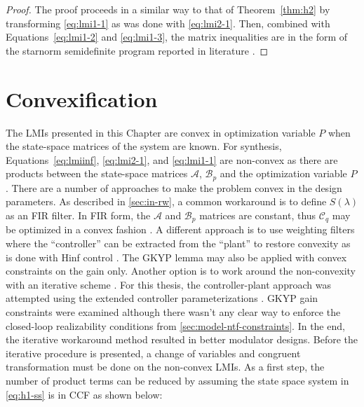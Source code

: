 \begin{proof}
	The proof proceeds in a similar way to that of Theorem~\ref{thm:h2} by transforming \autoref{eq:lmi1-1} as was done with \autoref{eq:lmi2-1}. Then, combined with Equations~\ref{eq:lmi1-2} and \ref{eq:lmi1-3}, the matrix inequalities are in the form of the \gls{starnorm} semidefinite program reported in literature \cite{Bu2000, Oberoi2005}.
\end{proof}

\section{Convexification}
\label{sec:opt-cvx}

The \gls{LMI}s presented in this Chapter are convex in optimization variable $P$ when the state-space matrices of the system are known. For synthesis, Equations~\ref{eq:lmiinf}, \ref{eq:lmi2-1}, and \ref{eq:lmi1-1} are non-convex as there are products between the state-space matrices $\mathcal{A}$, $\mathcal{B}_p$ and the optimization variable $P$. There are a number of approaches to make the problem convex in the design parameters. As described in \autoref{sec:in-rw}, a common workaround is to define $S(\lambda)$ as an \gls{FIR} filter. In \gls{FIR} form, the $\mathcal{A}$ and $\mathcal{B}_p$ matrices are constant, thus $\mathcal{C}_q$ may be optimized in a convex fashion \cite{Nagahara2012, Tariq2016}. A different approach is to use weighting filters where the ``controller'' can be extracted from the ``plant'' to restore convexity as is done with \gls{Hinf} control \cite{Oberoi2004, Tariq2016}. The \gls{GKYP} lemma may also be applied with convex constraints on the gain only. Another option is to work around the non-convexity with an iterative scheme \cite{Shishkin2017}. For this thesis, the controller-plant approach was attempted using the extended controller parameterizations \cite{DeOliveira2002}. \gls{GKYP} gain constraints were examined although there wasn't any clear way to enforce the closed-loop realizability conditions from \autoref{sec:model-ntf-constraints}. In the end, the iterative workaround method resulted in better modulator designs. Before the iterative procedure is presented, a change of variables and congruent transformation must be done on the non-convex \gls{LMI}s. As a first step, the number of product terms can be reduced by assuming the state space system in \autoref{eq:h1-ss} is in \gls{CCF} as shown below:

